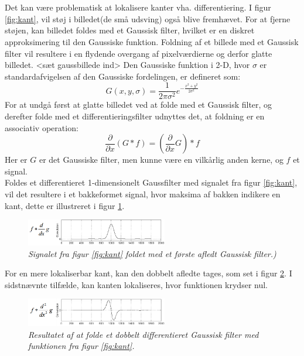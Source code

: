 \\
\\
Det kan være problematisk at lokalisere kanter vha. differentiering. I figur \ref{fig:kant}, vil støj i billedet(de små udsving) også blive fremhævet. For at fjerne støjen, kan billedet foldes med et Gaussisk filter, hvilket er en diskret approksimering til den Gaussiske funktion. Foldning af et billede med et Gaussisk filter vil resultere i en flydende overgang af pixelværdierne og derfor glatte billedet. <sæt gaussbillede ind> Den Gaussiske funktion i 2-D, hvor $ \sigma $ er standardafvigelsen af den Gaussiske fordelingen, er defineret som:
\begin{equation}
G(x,y,\sigma) = \frac{1}{2 \pi \sigma ^{2}} e^{- \frac{x^{2} + y^{2}}{2 \sigma ^{2}}}
\label{2dgaussian}
\end{equation} 
For at undgå først at glatte billedet ved at folde med et Gaussisk filter, og derefter folde med et differentieringsfilter udnyttes det, at foldning er en associativ operation:
\begin{equation}
\dfrac{\partial}{\partial x}(G \ast f) = (\dfrac{\partial}{\partial x}G) \ast f
\end{equation}
Her er $G$ er det Gaussiske filter, men kunne være en vilkårlig anden kerne, og $f$ et signal. 
\\
Foldes et differentieret 1-dimensionelt Gaussfilter med signalet fra figur \ref{fig:kant}, vil det resultere i et bakkeformet signal, hvor maksima af bakken indikere en kant, dette er illustreret i figur \ref{fig:firstd}.
\begin{figure}[H]
    \centering
    \includegraphics[width=0.55\textwidth]{fig/100.png}
     \vspace{-1em}
    \begin{center}        
     \caption{{\footnotesize \textit{
Signalet fra figur \ref{fig:kant} foldet med et første afledt Gaussisk filter.)}}}
    \label{fig:firstd}
     \end{center}
       \vspace{-2.5em}
  \end{figure}
\noindent
For en mere lokaliserbar kant, kan den dobbelt afledte tages, som set i figur \ref{fig:deriv}. I sidstnævnte tilfælde, kan kanten lokaliseres, hvor funktionen krydser nul.
\begin{figure}[H]
    \centering
    \includegraphics[width=0.55\textwidth]{fig/101.png}
    \vspace{-1em}   
    \begin{center}
    \caption{{\footnotesize \textit{
     Resultatet af at folde et dobbelt differentieret Gaussisk filter med funktionen fra figur \ref{fig:kant}.}}}
    \label{fig:deriv}
     \end{center}
    \vspace{-2.5em}  
  \end{figure}
